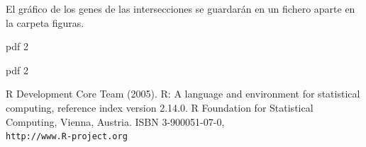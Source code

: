 \documentclass[a4paper,10pt]{article}
\begin{document}
El gráfico de los genes de las intersecciones se guardarán en un fichero aparte en la carpeta figuras.

\begin{Schunk}
\begin{Soutput}
pdf 
  2 
\end{Soutput}
\begin{Soutput}
pdf 
  2 
\end{Soutput}
\end{Schunk}

\newpage

\begin{thebibliography}{9}


 R Development Core Team (2005). R: A language and environment for statistical computing, 
reference index version 2.14.0. R Foundation for Statistical Computing, Vienna, Austria. ISBN 3-900051-07-0, \\ 
\verb|http://www.R-project.org|




\end{thebibliography}
\end{document}
